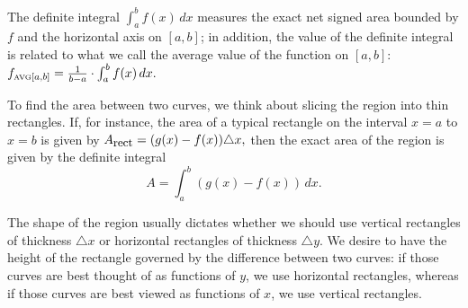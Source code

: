 
\begin{summary}
\item The definite integral $\int_a^b f(x) \,dx$ measures the exact net signed area bounded by $f$ and the horizontal axis on $[a,b]$; in addition, the value of the definite integral is related to what we call the average value of the function on $[a,b]$: $f_{\mbox{\tiny{AVG}}[a,b]} = \frac{1}{b-a} \cdot \int_a^b f(x) \, dx.$  

\item To find the area between two curves, we think about slicing the region into thin rectangles.  If, for instance, the area of a typical rectangle on the interval $x = a$ to $x = b$ is given by $A_{\mbox{\small{rect}}} = (g(x) - f(x)) \triangle x,$ then the exact area of the region is given by the definite integral
\[ A = \int_a^b (g(x)-f(x))\, dx. \]

\item The shape of the region usually dictates whether we should use vertical rectangles of thickness $\triangle x$ or horizontal rectangles of thickness $\triangle y$.  We desire to have the height of the rectangle governed by the difference between two curves:  if those curves are best thought of as functions of $y$, we use horizontal rectangles, whereas if those curves are best viewed as functions of $x$, we use vertical rectangles.
\end{summary}

% 

\cleardoublepage